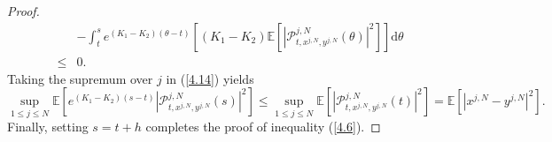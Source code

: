 \documentclass[12pt]{article}
\numberwithin{equation}{section}
\begin{document}
\begin{proof}
\begin{equation}
\begin{aligned}
&-\int_t^s  e^{\left(K_1-K_2\right)\left(\theta-t\right)}\left[\left(K_1-K_2\right)\mathbb{E}\left[\left|\mathcal{P}^{j,N}_{t, x^{j,N}, y^{j,N}}\left(\theta\right)\right|^{2}\right]\right]\mathrm{d} \theta\\
\leq&0.
\end{aligned}
\end{equation}
Taking the supremum over $ j $ in (\ref{4.14}) yields
\begin{equation}\tag{5.32}\label{4.15}
\underset{1\leqslant j\leqslant N}{\sup}\mathbb{E}\left[e^{\left(K_1-K_2\right)\left(s-t\right)}\left|\mathcal{P}^{j,N}_{t, x^{j,N}, y^{j,N}}\left(s\right)\right|^{2}\right] \leq \underset{1\leqslant j\leqslant N}{\sup}\mathbb{E}\left[\left|\mathcal{P}^{j,N}_{t, x^{j,N}, y^{j,N}}\left(t\right)\right|^{2}\right]=\mathbb{E}\left[\left|x^{j,N}-y^{j,N}\right|^{2}\right].
\end{equation}
Finally, setting $s=t+h$ completes the proof of inequality (\ref{4.6}).
 

\end{proof}
\end{document}
